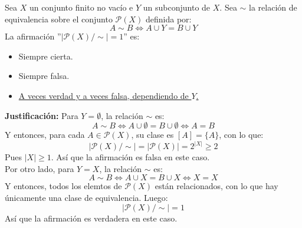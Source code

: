 \documentclass[12pt]{article}
\begin{document}
    \begin{ejercicio}
        Sea $X$ un conjunto finito no vacío e $Y$ un subconjunto de $X$. Sea $\sim$ la relación de equivalencia sobre el conjunto $\mathcal{P}(X)$ definida por:
        $$A \sim B \Leftrightarrow A \cup Y = B \cup Y$$
        La afirmación ''$|\mathcal{P}(X)/\sim|=1$'' es:
        \begin{itemize}
            \item Siempre cierta.
            \item Siempre falsa.
            \item \underline{A veces verdad y a veces falsa, dependiendo de $Y$.}
        \end{itemize}
        \textbf{Justificación:}\newline
        Para $Y = \emptyset$, la relación $\sim$ es:
        $$A \sim B \Leftrightarrow A \cup \emptyset = B \cup \emptyset \Leftrightarrow A = B$$
        Y entonces, para cada $A \in \mathcal{P}(X)$, su clase es $[A] = \{A\}$, con lo que:
        $$|\mathcal{P}(X)/\sim| = |\mathcal{P}(X)| = 2^{|X|} \geq 2$$
        Pues $|X| \geq 1$. Así que la afirmación es falsa en este caso.\\

        \noindent
        Por otro lado, para $Y=X$, la relación $\sim$ es:
        $$A \sim B \Leftrightarrow A \cup X = B \cup X \Leftrightarrow X = X$$
        Y entonces, todos los elemtos de $\mathcal{P}(X)$ están relacionados, con lo que hay únicamente una clase de equivalencia. Luego:
        $$|\mathcal{P}(X)/\sim| =1$$
        Así que la afirmación es verdadera en este caso.
    \end{ejercicio}
\end{document}
